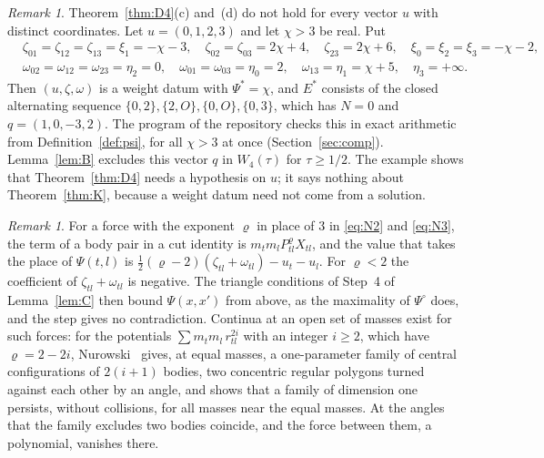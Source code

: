 \documentclass[11pt]{amsart}
\theoremstyle{definition}
\theoremstyle{remark}
\newtheorem{remark}[theorem]{Remark}
\numberwithin{equation}{section}
\newcommand{\repo}[1]{\texttt{\detokenize{#1}}}
\newcommand{\Ps}{\Psi^{*}}
\newcommand{\Es}{E^{*}}
\newcommand{\Po}{\Psi^{\circ}}
\begin{document}
\begin{remark}\label{rem:u0123}
Theorem~\ref{thm:D4}(c) and~(d) do not hold for every vector $u$ with distinct coordinates. Let
$u = (0, 1, 2, 3)$ and let $\chi > 3$ be real. Put
\begin{align*}
  & \zeta_{01} = \zeta_{12} = \zeta_{13} = \xi_1 = -\chi - 3, \quad \zeta_{02} = \zeta_{03} = 2\chi + 4, \quad
    \zeta_{23} = 2\chi + 6, \quad \xi_0 = \xi_2 = \xi_3 = -\chi - 2, \\
  & \omega_{02} = \omega_{12} = \omega_{23} = \eta_2 = 0, \quad \omega_{01} = \omega_{03} = \eta_0 = 2, \quad
    \omega_{13} = \eta_1 = \chi + 5, \quad \eta_3 = +\infty .
\end{align*}
Then $(u, \zeta, \omega)$ is a weight datum with $\Ps = \chi$, and $\Es$ consists of the closed alternating
sequence $\{0, 2\}, \{2, O\}, \{0, O\}, \{0, 3\}$, which has $N = 0$ and $q = (1, 0, -3, 2)$. The program
\repo{scripts/allN/wd_u0123_check.py} of the repository checks this in exact arithmetic from
Definition~\ref{def:psi}, for all $\chi > 3$ at once (Section~\ref{sec:comp}). Lemma~\ref{lem:B} excludes
this vector $q$ in $W_4(\tau)$ for $\tau \ge 1/2$. The example shows that Theorem~\ref{thm:D4} needs a
hypothesis on $u$; it says nothing about Theorem~\ref{thm:K}, because a weight datum need not come from
a solution.
\end{remark}

\begin{remark}\label{rem:exponent}
For a force with the exponent $\varrho$ in place of $3$ in \eqref{eq:N2} and \eqref{eq:N3}, the term
of a body pair in a cut identity is $m_t m_l P_{tl}^{\varrho} X_{tl}$, and the value that takes the
place of $\Psi(t, l)$ is $\tfrac12 (\varrho - 2)(\zeta_{tl} + \omega_{tl}) - u_t - u_l$. For
$\varrho < 2$ the coefficient of $\zeta_{tl} + \omega_{tl}$ is negative. The triangle conditions of
Step~4 of Lemma~\ref{lem:C} then bound $\Psi(x, x')$ from above, as the maximality of $\Po$ does, and
the step gives no contradiction. Continua at an open set of masses exist for such forces: for the
potentials $\sum m_t m_l\, r_{tl}^{2i}$ with an integer $i \ge 2$, which have $\varrho = 2 - 2i$,
Nurowski~\cite[Theorems~1.10 and~1.11]{nurowski2026} gives, at equal masses, a one-parameter family of
central configurations of $2(i + 1)$ bodies, two concentric regular polygons turned against each other
by an angle, and shows that a family of dimension one persists, without collisions, for all masses
near the equal masses. At the angles that the family excludes two bodies coincide, and the force
between them, a polynomial, vanishes there.
\end{remark}
\end{document}

